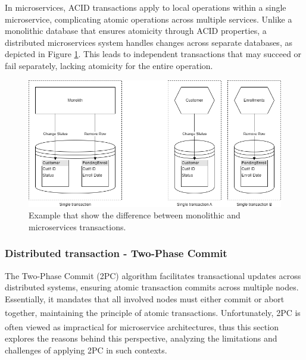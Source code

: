 In microservices, ACID transactions apply to local operations within a single microservice,
complicating atomic operations across multiple services. Unlike a monolithic database that ensures
atomicity through ACID properties, a distributed microservices system handles changes across
separate databases, as depicted in Figure \ref{fig:3_transaction}. This leads to independent
transactions that may succeed or fail separately, lacking atomicity for the entire operation.


\begin{figure}
    \centering
    \includegraphics[scale=0.5]{Pictures/3_transaction.png}
    \caption{Example that show the difference between monolithic and microservices transactions.}
    \label{fig:3_transaction}
\end{figure}

\subsubsection{Distributed transaction - Two-Phase Commit}
The Two-Phase Commit (2PC) algorithm facilitates transactional updates across distributed systems,
ensuring atomic transaction commits across multiple nodes. Essentially, it mandates that all
involved nodes must either commit or abort together, maintaining the principle of atomic
transactions\textsuperscript{\cite{2pc_1}}. Unfortunately, 2PC is often viewed as impractical for
microservice architectures\textsuperscript{\cite{microservices_book}}, thus this section explores the
reasons behind this perspective, analyzing the limitations and challenges of applying 2PC in such
contexts.

